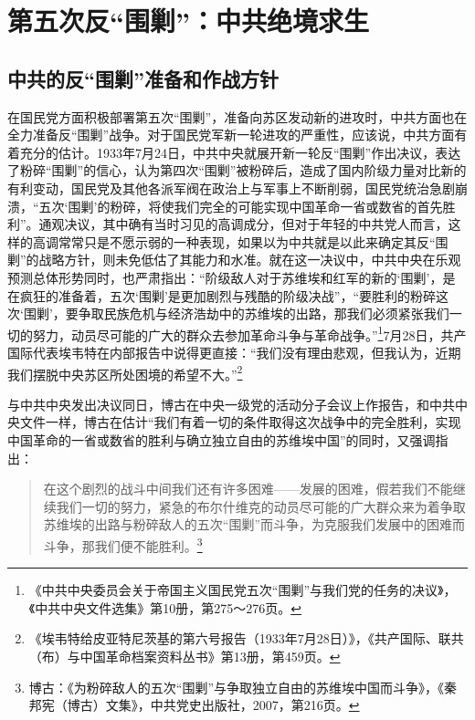 \chapter{第五次反“围剿”：中共绝境求生}

\section{中共的反“围剿”准备和作战方针}


在国民党方面积极部署第五次“围剿”，准备向苏区发动新的进攻时，中共方面也在全力准备反“围剿”战争。对于国民党军新一轮进攻的严重性，应该说，中共方面有着充分的估计。1933年7月24日，中共中央就展开新一轮反“围剿”作出决议，表达了粉碎“围剿”的信心，认为第四次“围剿”被粉碎后，造成了国内阶级力量对比新的有利变动，国民党及其他各派军阀在政治上与军事上不断削弱，国民党统治急剧崩溃，“五次‘围剿’的粉碎，将使我们完全的可能实现中国革命一省或数省的首先胜利”。通观决议，其中确有当时习见的高调成分，但对于年轻的中共党人而言，这样的高调常常只是不愿示弱的一种表现，如果以为中共就是以此来确定其反“围剿”的战略方针，则未免低估了其能力和水准。就在这一决议中，中共中央在乐观预测总体形势同时，也严肃指出：“阶级敌人对于苏维埃和红军的新的‘围剿’，是在疯狂的准备着，五次‘围剿’是更加剧烈与残酷的阶级决战”，“要胜利的粉碎这次‘围剿’，要争取民族危机与经济浩劫中的苏维埃的出路，那我们必须紧张我们一切的努力，动员尽可能的广大的群众去参加革命斗争与革命战争。”\footnote{《中共中央委员会关于帝国主义国民党五次“围剿”与我们党的任务的决议》，《中共中央文件选集》第10册，第275～276页。}7月28日，共产国际代表埃韦特在内部报告中说得更直接：“我们没有理由悲观，但我认为，近期我们摆脱中央苏区所处困境的希望不大。”\footnote{《埃韦特给皮亚特尼茨基的第六号报告（1933年7月28日）》，《共产国际、联共（布）与中国革命档案资料丛书》第13册，第459页。}


与中共中央发出决议同日，博古在中央一级党的活动分子会议上作报告，和中共中央文件一样，博古在估计“我们有着一切的条件取得这次战争中的完全胜利，实现中国革命的一省或数省的胜利与确立独立自由的苏维埃中国”的同时，又强调指出：

\begin{quote}

在这个剧烈的战斗中间我们还有许多困难——发展的困难，假若我们不能继续我们一切的努力，紧急的布尔什维克的动员尽可能的广大群众来为着争取苏维埃的出路与粉碎敌人的五次“围剿”而斗争，为克服我们发展中的困难而斗争，那我们便不能胜利。\footnote{博古：《为粉碎敌人的五次“围剿”与争取独立自由的苏维埃中国而斗争》，《秦邦宪（博古）文集》，中共党史出版社，2007，第216页。}
\end{quote}



